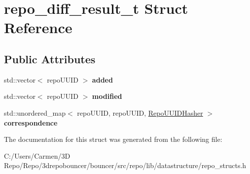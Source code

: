 \hypertarget{structrepo__diff__result__t}{}\section{repo\+\_\+diff\+\_\+result\+\_\+t Struct Reference}
\label{structrepo__diff__result__t}
\subsection*{Public Attributes}
\begin{DoxyCompactItemize}
\item 
\hypertarget{structrepo__diff__result__t_af3d8fe09b919ccd0cfcfdc2c3d0ca6ef}{}std\+::vector$<$ repo\+U\+U\+I\+D $>$ {\bfseries added}\label{structrepo__diff__result__t_af3d8fe09b919ccd0cfcfdc2c3d0ca6ef}

\item 
\hypertarget{structrepo__diff__result__t_a810771908512970e98f6365e0b21664a}{}std\+::vector$<$ repo\+U\+U\+I\+D $>$ {\bfseries modified}\label{structrepo__diff__result__t_a810771908512970e98f6365e0b21664a}

\item 
\hypertarget{structrepo__diff__result__t_a07f698d79eb68be682fece9f7edef8c5}{}std\+::unordered\+\_\+map$<$ repo\+U\+U\+I\+D, repo\+U\+U\+I\+D, \hyperlink{struct_repo_u_u_i_d_hasher}{Repo\+U\+U\+I\+D\+Hasher} $>$ {\bfseries correspondence}\label{structrepo__diff__result__t_a07f698d79eb68be682fece9f7edef8c5}

\end{DoxyCompactItemize}


The documentation for this struct was generated from the following file\+:\begin{DoxyCompactItemize}
\item 
C\+:/\+Users/\+Carmen/3\+D Repo/\+Repo/3drepobouncer/bouncer/src/repo/lib/datastructure/repo\+\_\+structs.\+h\end{DoxyCompactItemize}
